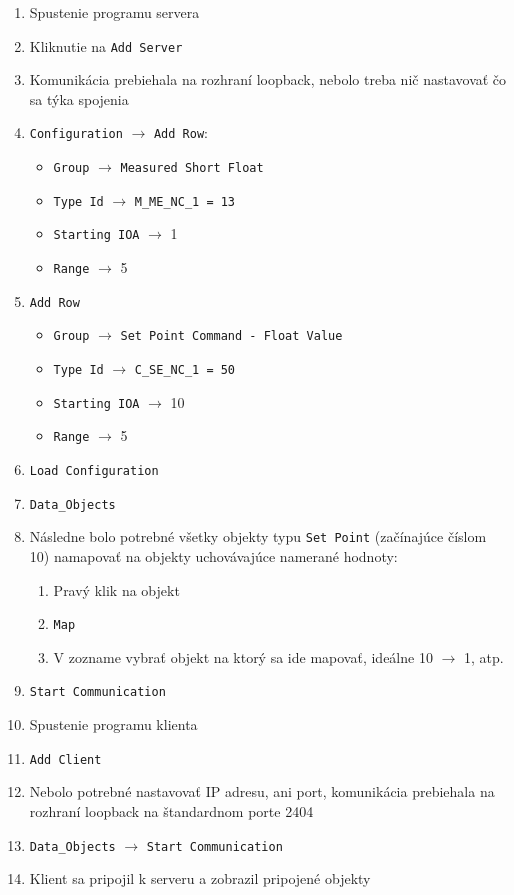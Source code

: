 \begin{enumerate}
\item Spustenie programu servera
\item Kliknutie na {\tt Add Server}
\item Komunikácia prebiehala na rozhraní loopback, nebolo treba nič nastavovať čo sa týka spojenia
\item {\tt Configuration} $\rightarrow$ {\tt Add Row}:
\begin{itemize}
\item {\tt Group} $\rightarrow$ {\tt Measured Short Float}
\item {\tt Type Id} $\rightarrow$ {\tt M\_ME\_NC\_1 = 13}
\item {\tt Starting IOA} $\rightarrow$ 1
\item {\tt Range} $\rightarrow$ 5
\end{itemize}
\item {\tt Add Row}
\begin{itemize}
\item {\tt Group} $\rightarrow$ {\tt Set Point Command - Float Value}
\item {\tt Type Id} $\rightarrow$ {\tt C\_SE\_NC\_1 = 50}
\item {\tt Starting IOA} $\rightarrow$ 10
\item {\tt Range} $\rightarrow$ 5
\end{itemize}
\item {\tt Load Configuration}
\item {\tt Data\_Objects}
\item Následne bolo potrebné všetky objekty typu {\tt Set Point} (začínajúce číslom 10) namapovať na objekty uchovávajúce namerané hodnoty:
\begin{enumerate}
\item Pravý klik na objekt
\item {\tt Map}
\item V zozname vybrať objekt na ktorý sa ide mapovať, ideálne 10 $\rightarrow$ 1, atp.
\end{enumerate}
\item {\tt Start Communication}
\item Spustenie programu klienta
\item {\tt Add Client}
\item Nebolo potrebné nastavovať IP adresu, ani port, komunikácia prebiehala na rozhraní loopback na štandardnom porte 2404
\item {\tt Data\_Objects} $\rightarrow$ {\tt Start Communication}
\item Klient sa pripojil k serveru a zobrazil pripojené objekty
\end{enumerate}
